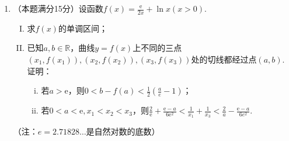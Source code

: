 \documentclass[UTF8]{ctexart}
\newcommand{\mathe}{\mathrm{e}}
\newenvironment{enumerateroman}{\begin{enumerate}[i.] }{\end{enumerate}}
\newenvironment{enumerateromancap}{\begin{enumerate}[I.] }{\end{enumerate}}
\begin{document}
\begin{enumerate}
  \begin{multicols}{2}
    (I) 求点$P$到椭圆上点的距离的最大值；
    
    (II) 求$| \mathit{CD} |$的最小值.
    
  \end{multicols}
  
  \item （本题满分15分）设函数$f (x) = \frac{\mathe}{2 x} + \ln x (x
  > 0)$.
  \begin{enumerateromancap}
    \item 求$f (x)$的单调区间；
    
    \item 已知$a, b \in \mathbb{R}$，曲线$y = f
    (x)$上不同的三点$(x_1, f (x_1)), (x_2, f (x_2)), (x_3, f
    (x_3))$处的切线都经过点$(a, b)$. 证明：
    \begin{enumerateroman}
      \item 若$a > \mathe$，则$0 < b - f (a) < \frac{1}{2} \left(
      \frac{a}{e} - 1 \right)$；
      
      \item 若$0 < a < \mathe, x_1 < x_2 < x_3$，则$\frac{2}{\mathe} +
      \frac{\mathe - a}{6 \mathe^2} < \frac{1}{x_1} + \frac{1}{x_3} <
      \frac{2}{a} - \frac{\mathe - a}{6 e^2}$.
    \end{enumerateroman}
  \end{enumerateromancap}
  （注：$e = 2.71828 \ldots$是自然对数的底数）
\end{enumerate}
\end{document}
